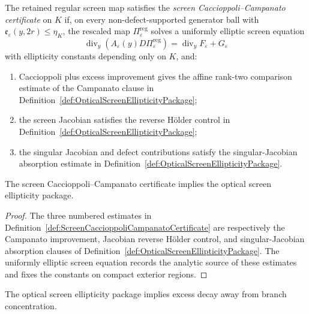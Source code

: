 \begin{definition}\label{def:ScreenCaccioppoliCampanatoCertificate}
The retained regular screen map satisfies the \emph{screen Caccioppoli--Campanato certificate} on $K$ if, on every non-defect-supported generator ball with $\mathfrak e_\varepsilon(y,2r)\le\eta_K$, the rescaled map $\Pi_\varepsilon^{\mathrm{reg}}$ solves a uniformly elliptic screen equation
\[
    \operatorname{div}_y(A_\varepsilon(y)D\Pi_\varepsilon^{\mathrm{reg}})
    =
    \operatorname{div}_y F_\varepsilon+G_\varepsilon
\]
with ellipticity constants depending only on $K$, and:
\begin{enumerate}
    \item Caccioppoli plus excess improvement gives the affine rank-two comparison estimate of the Campanato clause in Definition~\ref{def:OpticalScreenEllipticityPackage};
    \item the screen Jacobian satisfies the reverse H\"older control in Definition~\ref{def:OpticalScreenEllipticityPackage};
    \item the singular Jacobian and defect contributions satisfy the singular-Jacobian absorption estimate in Definition~\ref{def:OpticalScreenEllipticityPackage}.
\end{enumerate}
\end{definition}

\begin{proposition}\label{prop:ScreenEllipticityCertificateGate}
The screen Caccioppoli--Campanato certificate implies the optical screen ellipticity package.
\end{proposition}

\begin{proof}
The three numbered estimates in Definition~\ref{def:ScreenCaccioppoliCampanatoCertificate} are respectively the Campanato improvement, Jacobian reverse H\"older control, and singular-Jacobian absorption clauses of Definition~\ref{def:OpticalScreenEllipticityPackage}. The uniformly elliptic screen equation records the analytic source of these estimates and fixes the constants on compact exterior regions.
\end{proof}

\begin{lemma}\label{lem:ScreenEllipticityExcessDecay}
The optical screen ellipticity package implies excess decay away from branch concentration.
\end{lemma}

